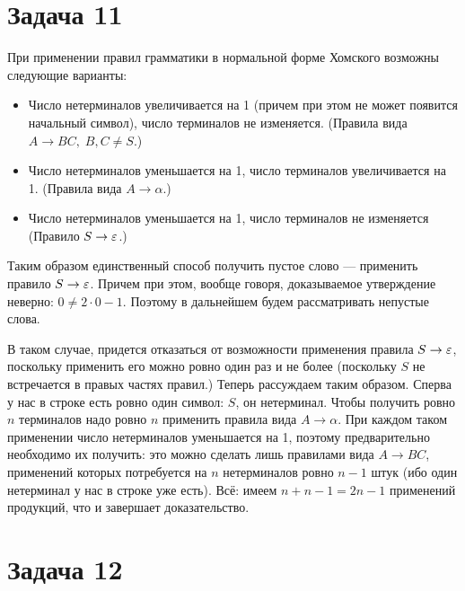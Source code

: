 \documentclass[12pt]{article}
\begin{document}
\section{Задача 11}
При применении правил грамматики в нормальной форме Хомского возможны следующие варианты:
\begin{itemize}
    \item Число нетерминалов увеличивается на 1 (причем при этом не может появится начальный символ), число терминалов не изменяется. (Правила вида $A\to BC,\;B,C\ne S$.)
    \item Число нетерминалов уменьшается на 1, число терминалов увеличивается на 1. (Правила вида $A\to \alpha$.)
    \item Число нетерминалов уменьшается на 1, число терминалов не изменяется (Правило $S\to\varepsilon$.)
\end{itemize}
Таким образом единственный способ получить пустое слово --- применить правило $S\to\varepsilon$. Причем при этом, вообще говоря, доказываемое утверждение неверно: $0\ne 2\cdot 0 - 1$. Поэтому в дальнейшем будем рассматривать непустые слова.

В таком случае, придется отказаться от возможности применения правила $S\to\varepsilon$, поскольку применить его можно ровно один раз и не более (поскольку $S$ не встречается в правых частях правил.) Теперь рассуждаем таким образом. Сперва у нас в строке есть ровно один символ: $S$, он нетерминал. Чтобы получить ровно $n$ терминалов надо ровно $n$ применить правила вида $A\to\alpha$. При каждом таком применении число нетерминалов уменьшается на 1, поэтому предварительно необходимо их получить: это можно сделать лишь правилами  вида $A\to BC$, применений которых потребуется на $n$ нетерминалов ровно $n-1$ штук (ибо один нетерминал у нас в строке уже есть). Всё: имеем $n+n-1=2n-1$ применений продукций, что и завершает доказательство.

\section{Задача 12}
\al{
    
}
\end{document}
